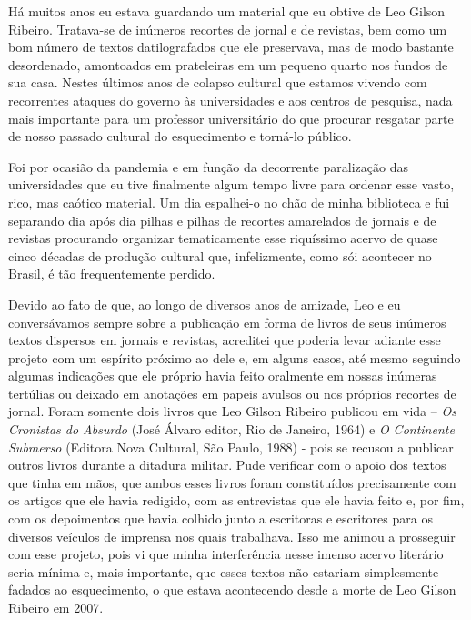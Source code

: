 \documentclass[
  a4paper,
  oneside]{scrbook}
\begin{document}
Há muitos anos eu estava guardando um material que eu obtive de Leo
Gilson Ribeiro. Tratava-se de inúmeros recortes de jornal e de revistas,
bem como um bom número de textos datilografados que ele preservava, mas
de modo bastante desordenado, amontoados em prateleiras em um pequeno
quarto nos fundos de sua casa. Nestes últimos anos de colapso cultural
que estamos vivendo com recorrentes ataques do governo às universidades
e aos centros de pesquisa, nada mais importante para um professor
universitário do que procurar resgatar parte de nosso passado cultural
do esquecimento e torná-lo público.

Foi por ocasião da pandemia e em função da decorrente paralização das
universidades que eu tive finalmente algum tempo livre para ordenar esse
vasto, rico, mas caótico material. Um dia espalhei-o no chão de minha
biblioteca e fui separando dia após dia pilhas e pilhas de recortes
amarelados de jornais e de revistas procurando organizar tematicamente
esse riquíssimo acervo de quase cinco décadas de produção cultural que,
infelizmente, como sói acontecer no Brasil, é tão frequentemente
perdido.

Devido ao fato de que, ao longo de diversos anos de amizade, Leo e eu
conversávamos sempre sobre a publicação em forma de livros de seus
inúmeros textos dispersos em jornais e revistas, acreditei que poderia
levar adiante esse projeto com um espírito próximo ao dele e, em alguns
casos, até mesmo seguindo algumas indicações que ele próprio havia feito
oralmente em nossas inúmeras tertúlias ou deixado em anotações em papeis
avulsos ou nos próprios recortes de jornal. Foram somente dois livros
que Leo Gilson Ribeiro publicou em vida -- \emph{Os Cronistas do
Absurdo} (José Álvaro editor, Rio de Janeiro, 1964) e \emph{O Continente
Submerso} (Editora Nova Cultural, São Paulo, 1988) - pois se recusou a
publicar outros livros durante a ditadura militar. Pude verificar com o
apoio dos textos que tinha em mãos, que ambos esses livros foram
constituídos precisamente com os artigos que ele havia redigido, com as
entrevistas que ele havia feito e, por fim, com os depoimentos que havia
colhido junto a escritoras e escritores para os diversos veículos de
imprensa nos quais trabalhava. Isso me animou a prosseguir com esse
projeto, pois vi que minha interferência nesse imenso acervo literário
seria mínima e, mais importante, que esses textos não estariam
simplesmente fadados ao esquecimento, o que estava acontecendo desde a
morte de Leo Gilson Ribeiro em 2007.
\end{document}
